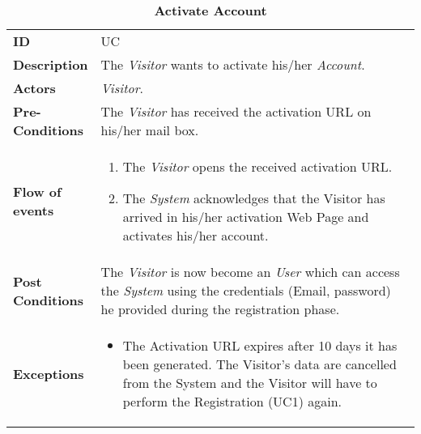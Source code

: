 \begin{longtable}{|p{0.2\linewidth} p{0.8\linewidth}|}
	\captionsetup{labelformat=empty} %
	\caption{\textbf{Activate Account}} %
	\label{UC_Activate}	\\ \hline
	
	\textbf{ID} & UC\theUseCaseIdCounter \\ \hline
	\textbf{Description} & The \emph{Visitor} wants to activate his/her \emph{Account}. \\ \hline
	\textbf{Actors} & \emph{Visitor}.\\ \hline
	\textbf{Pre-Conditions} & The \emph{Visitor} has received the activation URL on his/her mail box. \\ \hline
	\textbf{Flow of events} & 
	\begin{enumerate}
		\item The \emph{Visitor} opens the received activation URL.
		\item The \emph{System} acknowledges that the Visitor has arrived in his/her activation Web Page and activates his/her account.
	\end{enumerate}	 \\ \hline
	\textbf{Post Conditions} & The \emph{Visitor} is now become an \emph{User} which can access the \emph{System} using the credentials (Email, password) he provided during the registration phase. \\ \hline
	\textbf{Exceptions} & 
	\begin{itemize}
		\item The Activation URL expires after 10 days it has been generated. The Visitor's data are cancelled from the System and the Visitor will have to perform the Registration (UC1) again.
	\end{itemize} \\ \hline
\end{longtable}


